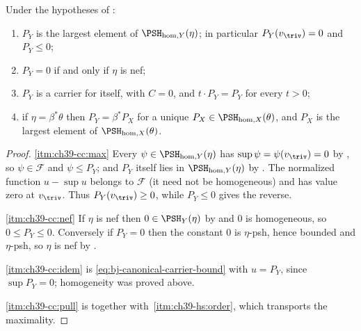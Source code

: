 \begin{proposition}
\label{prop:ch39-canonical-carrier-props}
Under the hypotheses of :
\begin{enumerate}
\item\label{itm:ch39-cc:max} $P_Y$ is the largest element of
 $\PSH_{\mathrm{hom},Y}(\eta)$; in particular
 $P_Y(v_{\triv})=0$ and $P_Y\le0$;
\item\label{itm:ch39-cc:nef} $P_Y=0$ if and only if $\eta$ is nef;
\item\label{itm:ch39-cc:idem} $P_Y$ is a carrier for itself, with
 $C=0$, and $t\cdot P_Y=P_Y$ for every $t>0$;
\item\label{itm:ch39-cc:pull} if $\eta=\beta^*\theta$ then
 $P_Y=\beta^*P_X$ for a unique
 $P_X\in\PSH_{\mathrm{hom},X}(\theta)$, and $P_X$ is the largest element
 of $\PSH_{\mathrm{hom},X}(\theta)$.
\end{enumerate}
\end{proposition}

\begin{proof}
\cref{itm:ch39-cc:max}  Every $\psi\in\PSH_{\mathrm{hom},Y}(\eta)$ has
$\sup\psi=\psi(v_{\triv})=0$ by
, so $\psi\in\mathcal F$ and
$\psi\le P_Y$; and $P_Y$ itself lies in
$\PSH_{\mathrm{hom},Y}(\eta)$ by .  The normalized function $u-\sup u$ belongs to $\mathcal F$ (it need
not be homogeneous) and has value zero at $v_{\triv}$.  Thus
$P_Y(v_{\triv})\ge0$, while
$P_Y\le0$ gives the reverse.

\cref{itm:ch39-cc:nef}  If $\eta$ is nef then $0\in\PSH_Y(\eta)$ by
 and $0$ is homogeneous, so $0\le P_Y\le0$.
Conversely if $P_Y=0$ then the constant $0$ is $\eta$-psh, hence
bounded and $\eta$-psh, so $\eta$ is nef by
.

\cref{itm:ch39-cc:idem} is \eqref{eq:bj-canonical-carrier-bound} with
$u=P_Y$, since $\sup P_Y=0$; homogeneity was proved above.

\cref{itm:ch39-cc:pull} is  together with
\,\cref{itm:ch39-hs:order}, which transports the
maximality.
\end{proof}

